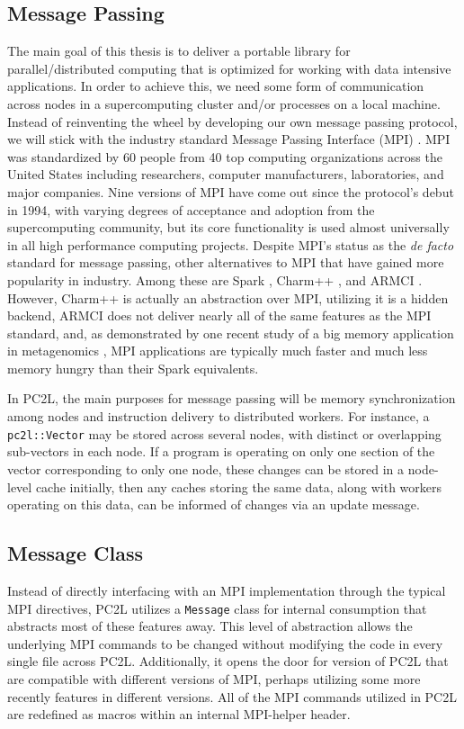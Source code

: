 \subsection{Message Passing}
The main goal of this thesis is to deliver a portable library for parallel/distributed computing that is optimized for working with data intensive applications. In order to achieve this, we need some form of communication across nodes in a supercomputing cluster and/or processes on a local machine. Instead of reinventing the wheel by developing our own message passing protocol, we will stick with the industry standard Message Passing Interface (MPI) \cite{mpi}. MPI was standardized by 60 people from 40 top computing organizations across the United States including researchers, computer manufacturers, laboratories, and major companies. Nine versions of MPI have come out since the protocol's debut in 1994, with varying degrees of acceptance and adoption from the supercomputing community, but its core functionality is used almost universally in all high performance computing projects. Despite MPI's status as the \textit{de facto} standard for message passing, other alternatives to MPI that have gained more popularity in industry. Among these are Spark \cite{spark}, Charm++ \cite{parallel_programming_w_charm}, and ARMCI \cite{ARMCI}. However, Charm++ is actually an abstraction over MPI, utilizing it is a hidden backend, ARMCI does not deliver nearly all of the same features as the MPI standard, and, as demonstrated by one recent study of a big memory application in metagenomics \cite{metagenomics}, MPI applications are typically much faster and much less memory hungry than their Spark equivalents. 

In PC2L, the main purposes for message passing will be memory synchronization among nodes and instruction delivery to distributed workers. For instance, a \texttt{pc2l::Vector} may be stored across several nodes, with distinct or overlapping sub-vectors in each node. If a program is operating on only one section of the vector corresponding to only one node, these changes can be stored in a node-level cache initially, then any caches storing the same data, along with workers operating on this data, can be informed of changes via an update message.  

\subsection{Message Class}
Instead of directly interfacing with an MPI implementation through the typical MPI directives, PC2L utilizes a \texttt{Message} class for internal consumption that abstracts most of these features away. This level of abstraction allows the underlying MPI commands to be changed without modifying the code in every single file across PC2L. Additionally, it opens the door for version of PC2L that are compatible with different versions of MPI, perhaps utilizing some more recently features in different versions. All of the MPI commands utilized in PC2L are redefined as macros within an internal MPI-helper header. 

